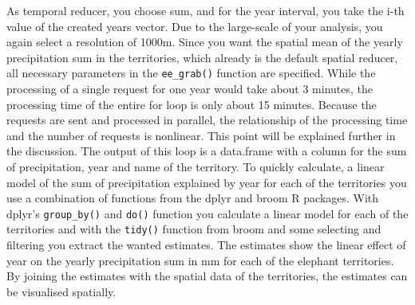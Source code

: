 As temporal reducer, you choose sum, and for the year interval, you take the i-th value of the created years vector. Due to the large-scale of your analysis, you again select a resolution of 1000m. Since you want the spatial mean of the yearly precipitation sum in the territories, which already is the default spatial reducer, all necessary parameters in the \texttt{ee\_grab()} function are specified. While the processing of a single request for one year would take about 3 minutes, the processing time of the entire for loop is only about 15 minutes. Because the requests are sent and processed in parallel, the relationship of the processing time and the number of requests is nonlinear. This point will be explained further in the discussion. The output of this loop is a data.frame with a column for the sum of precipitation, year and name of the territory.  To quickly calculate, a linear model of the sum of precipitation explained by year for each of the territories you use a combination of functions from the dplyr and broom R packages. With dplyr's \texttt{group\_by()} and \texttt{do()} function you calculate a linear model for each of the territories and with the \texttt{tidy()} function from broom and some selecting and filtering you extract the wanted estimates. The estimates show the linear effect of year on the yearly precipitation sum in mm for each of the elephant territories. 
By joining the estimates with the spatial data of the territories, the estimates can be visualised spatially. 

